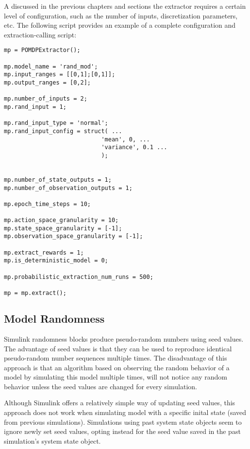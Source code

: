 A discussed in the previous chapters and sections the extractor requires a certain level of configuration, such as the number of inputs, discretization parameters, etc. The following script provides an example of a complete configuration and extraction-calling script:

\begin{verbatim}
mp = POMDPExtractor();

mp.model_name = 'rand_mod';
mp.input_ranges = [[0,1];[0,1]];
mp.output_ranges = [0,2];

mp.number_of_inputs = 2;
mp.rand_input = 1;

mp.rand_input_type = 'normal';
mp.rand_input_config = struct( ...
                            'mean', 0, ...
                            'variance', 0.1 ...
                            );


mp.number_of_state_outputs = 1;
mp.number_of_observation_outputs = 1;

mp.epoch_time_steps = 10;

mp.action_space_granularity = 10;
mp.state_space_granularity = [-1];
mp.observation_space_granularity = [-1];

mp.extract_rewards = 1;
mp.is_deterministic_model = 0;

mp.probabilistic_extraction_num_runs = 500;

mp = mp.extract();
\end{verbatim}

\subsection{Model Randomness}

Simulink randomness blocks produce pseudo-random numbers using seed values. The advantage of seed values is that they can be used to reproduce identical pseudo-random number sequences multiple times. The disadvantage of this approach is that an algorithm based on observing the random behavior of a model by simulating this model multiple times, will not notice any random behavior unless the seed values are changed for every simulation.

Although Simulink offers a relatively simple way of updating seed values, this approach does not work when simulating model with a specific inital state (saved from previous simulations). Simulations using past system state objects seem to ignore newly set seed values, opting instead for the seed value saved in the past simulation's system state object.

